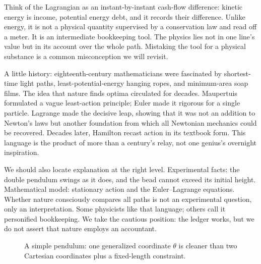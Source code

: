 \begin{mainline}
Think of the Lagrangian as an instant-by-instant cash-flow difference: kinetic energy is income, potential energy debt, and it records their difference. Unlike energy, it is not a physical quantity supervised by a conservation law and read off a meter. It is an intermediate bookkeeping tool. The physics lies not in one line's value but in its account over the whole path. Mistaking the tool for a physical substance is a common misconception we will revisit.

A little history: eighteenth-century mathematicians were fascinated by shortest-time light paths, least-potential-energy hanging ropes, and minimum-area soap films. The idea that nature finds optima circulated for decades. Maupertuis formulated a vague least-action principle; Euler made it rigorous for a single particle. Lagrange made the decisive leap, showing that it was not an addition to Newton's laws but another foundation from which all Newtonian mechanics could be recovered. Decades later, Hamilton recast action in its textbook form. This language is the product of more than a century's relay, not one genius's overnight inspiration.

We should also locate explanation at the right level. Experimental facts: the double pendulum swings as it does, and the bead cannot exceed its initial height. Mathematical model: stationary action and the Euler--Lagrange equations. Whether nature consciously compares all paths is not an experimental question, only an interpretation. Some physicists like that language; others call it personified bookkeeping. We take the cautious position: the ledger works, but we do not assert that nature employs an accountant.
\end{mainline}

\begin{figure}[htbp]
\centering
{}
\caption{A simple pendulum: one generalized coordinate \(\theta\) is cleaner than two Cartesian coordinates plus a fixed-length constraint.}
\end{figure}

